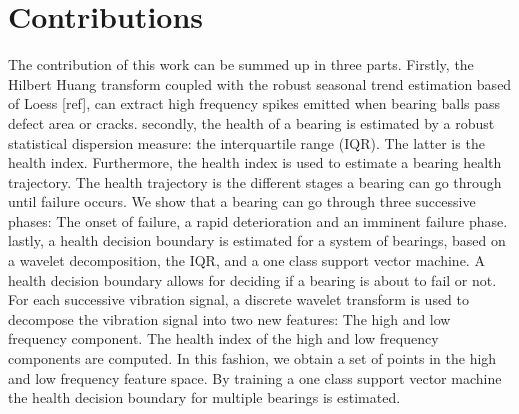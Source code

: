 \documentclass[../Main/thesis.tex]{subfiles}
\begin{document}

\section{Contributions }
\label{sec:contributions}
The contribution of this work can be summed up in three parts. Firstly, the Hilbert Huang transform coupled with the robust seasonal trend estimation based of Loess [ref], can extract high frequency spikes emitted when bearing balls pass defect area or cracks.
\justify
secondly, the health of a bearing is estimated by a robust statistical dispersion measure: the interquartile range (IQR). The latter is the health index. Furthermore,  the health index is used to estimate a bearing health trajectory. The health trajectory is the different stages a bearing can go through until failure occurs. We show that a bearing can go through three successive phases: The onset of failure, a rapid deterioration and an imminent failure phase. 
\justify
lastly, a health decision boundary is estimated for a system of bearings, based on a wavelet decomposition, the IQR, and a one class support vector machine. A health decision boundary allows for deciding if a bearing is about to fail or not. For each successive vibration signal, a discrete wavelet transform is used to decompose the vibration signal into two new features: The high and low frequency component. The health index of the high and low frequency components are computed. In this fashion, we obtain a set of points in the high and low frequency feature space. By training a one class support vector machine the health decision boundary for multiple bearings is estimated.


\blankpage
\end{document}
